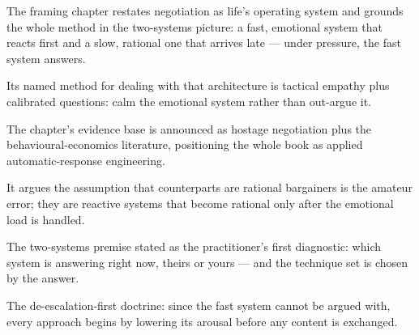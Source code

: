 

\begin{distilled}
  \item The framing chapter restates negotiation as life's operating system and grounds the whole method in the two-systems picture: a fast, emotional system that reacts first and a slow, rational one that arrives late --- under pressure, the fast system answers.
  \item Its named method for dealing with that architecture is tactical empathy plus calibrated questions: calm the emotional system rather than out-argue it.
  \item The chapter's evidence base is announced as hostage negotiation plus the behavioural-economics literature, positioning the whole book as applied automatic-response engineering.
  \item It argues the assumption that counterparts are rational bargainers is the amateur error; they are reactive systems that become rational only after the emotional load is handled.
\end{distilled}

\begin{unique}
  \item The two-systems premise stated as the practitioner's first diagnostic: which system is answering right now, theirs or yours --- and the technique set is chosen by the answer.
  \item The de-escalation-first doctrine: since the fast system cannot be argued with, every approach begins by lowering its arousal before any content is exchanged.
\end{unique}
